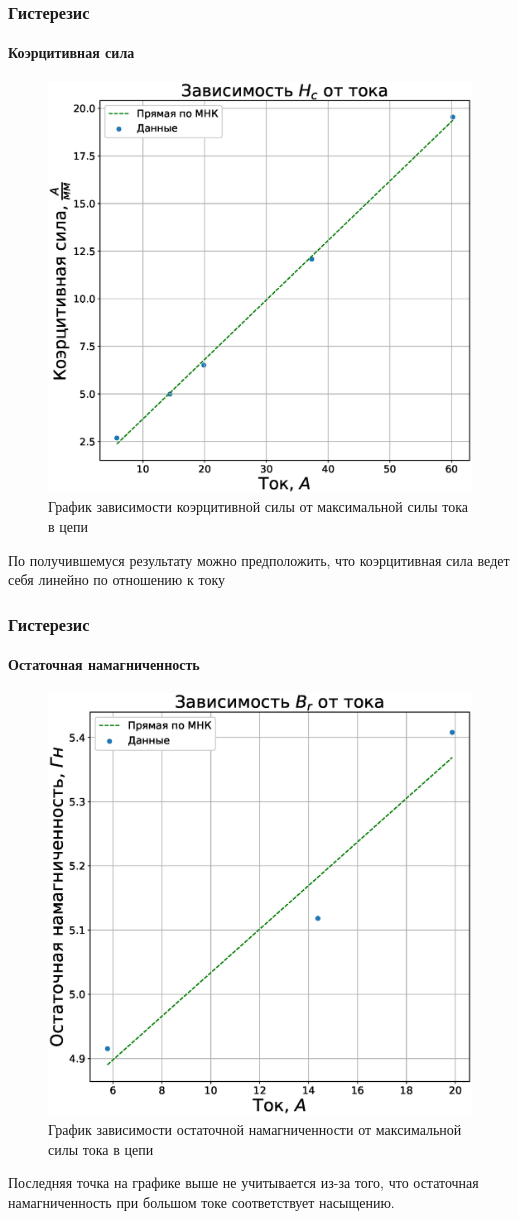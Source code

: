\documentclass[8pt,pdf,hyperref={unicode}]{beamer}
\begin{document}
	\begin{frame}
		\frametitle{Гистерезис}
		\framesubtitle{Коэрцитивная сила}
		\begin{center}
			\begin{figure}[h!]
				\centering
				\includegraphics[width=.45\linewidth]{Lab2_6.eps}
				\caption{График зависимости коэрцитивной силы от максимальной силы тока в цепи}
				\label{fig:3}
			\end{figure}
		По получившемуся результату можно предположить, что коэрцитивная сила ведет себя линейно по отношению к току
		\end{center}
	\end{frame}

	\begin{frame}
		\frametitle{Гистерезис}
		\framesubtitle{Остаточная намагниченность}
		\begin{center}
			\begin{figure}[h!]
				\centering
				\includegraphics[width=.4\linewidth]{Lab2_7.eps}
				\caption{График зависимости остаточной намагниченности от максимальной силы тока в цепи}
				\label{fig:3}
			\end{figure}
		Последняя точка на графике выше не учитывается из-за того, что остаточная намагниченность при большом токе соответствует насыщению.
		\end{center}
	\end{frame}
\end{document}
